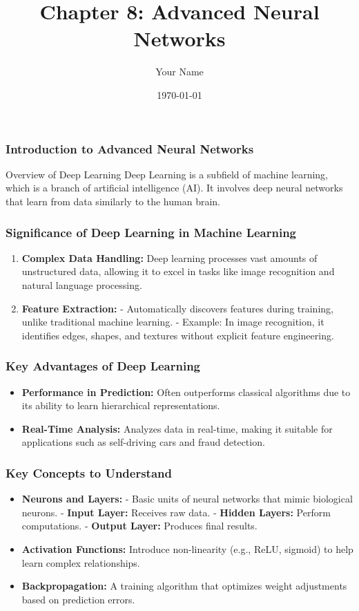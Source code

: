\documentclass{beamer}
\title{Chapter 8: Advanced Neural Networks}
\author{Your Name}
\institute{Your Institution}
\date{\today}
\begin{document}
\frame{\titlepage}

\begin{frame}[fragile]
    \frametitle{Introduction to Advanced Neural Networks}
    \begin{block}{Overview of Deep Learning}
        Deep Learning is a subfield of machine learning, which is a branch of artificial intelligence (AI). It involves deep neural networks that learn from data similarly to the human brain. 
    \end{block}
\end{frame}

\begin{frame}[fragile]
    \frametitle{Significance of Deep Learning in Machine Learning}
    \begin{enumerate}
        \item \textbf{Complex Data Handling:} 
        Deep learning processes vast amounts of unstructured data, allowing it to excel in tasks like image recognition and natural language processing.
        
        \item \textbf{Feature Extraction:}
        - Automatically discovers features during training, unlike traditional machine learning.
        - Example: In image recognition, it identifies edges, shapes, and textures without explicit feature engineering.
    \end{enumerate}
\end{frame}

\begin{frame}[fragile]
    \frametitle{Key Advantages of Deep Learning}
    \begin{itemize}
        \item \textbf{Performance in Prediction:} 
        Often outperforms classical algorithms due to its ability to learn hierarchical representations.
        
        \item \textbf{Real-Time Analysis:} 
        Analyzes data in real-time, making it suitable for applications such as self-driving cars and fraud detection.
    \end{itemize}
\end{frame}

\begin{frame}[fragile]
    \frametitle{Key Concepts to Understand}
    \begin{itemize}
        \item \textbf{Neurons and Layers:} 
        - Basic units of neural networks that mimic biological neurons.
        - \textbf{Input Layer:} Receives raw data.
        - \textbf{Hidden Layers:} Perform computations.
        - \textbf{Output Layer:} Produces final results.
        
        \item \textbf{Activation Functions:} 
        Introduce non-linearity (e.g., ReLU, sigmoid) to help learn complex relationships.
        
        \item \textbf{Backpropagation:} 
        A training algorithm that optimizes weight adjustments based on prediction errors.
    \end{itemize}
\end{frame}
\end{document}
